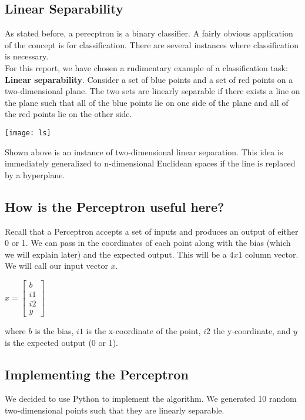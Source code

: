 \subsection{Linear Separability}

As stated before, a perecptron is a binary classifier. A fairly obvious application of the concept is for classification. There are several instances where classification is necessary. \\
		
		For this report, we have chosen a rudimentary example of a classification task: \textbf{Linear separability}. Consider a set of blue points and a set of red points on a two-dimensional plane. The two sets are linearly separable if there exists a line on the plane such that all of the blue points lie on one side of the plane and all of the red points lie on the other side. \\

\begin{center}
	\texttt{[image: ls]}
\end{center}

Shown above is an instance of two-dimensional linear separation. This idea is immediately generalized to n-dimensional Euclidean spaces if the line is replaced by a hyperplane.

\subsection{How is the Perceptron useful here?}
Recall that a Perceptron accepts a set of inputs and produces an output of either 0 or 1. We can pass in the coordinates of each point along with the bias (which we will explain later) and the expected output. This will be a $4x1$ column vector. We will call our input vector $x$. \\

	\begin{center}
		$x = 
		\begin{bmatrix}
			b \\
			i1 \\
			i2 \\
			y
		\end{bmatrix}
		$
	\end{center}

where $b$ is the bias, $i1$ is the x-coordinate of the point, $i2$ the y-coordinate, and $y$ is the expected output (0 or 1). \\

\subsection{Implementing the Perceptron}
We decided to use Python to implement the algorithm. We generated 10 random two-dimensional points such that they are linearly separable. \\

